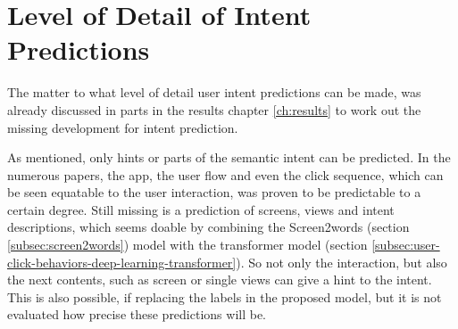 \section{Level of Detail of Intent Predictions}

The matter to what level of detail user intent predictions can be made, was already discussed in parts in the results chapter \ref{ch:results} to work out the missing development for intent prediction.

As mentioned, only hints or parts of the semantic intent can be predicted.
In the numerous papers, the app, the user flow and even the click sequence, which can be seen equatable to the user interaction, was proven to be predictable to a certain degree.
Still missing is a prediction of screens, views and intent descriptions, which seems doable by combining the Screen2words (section \ref{subsec:screen2words}) model with the transformer model (section \ref{subsec:user-click-behaviors-deep-learning-transformer}).
%
So not only the interaction, but also the next contents, such as screen or single views can give a hint to the intent.
This is also possible, if replacing the labels in the proposed model, but it is not evaluated how precise these predictions will be.


